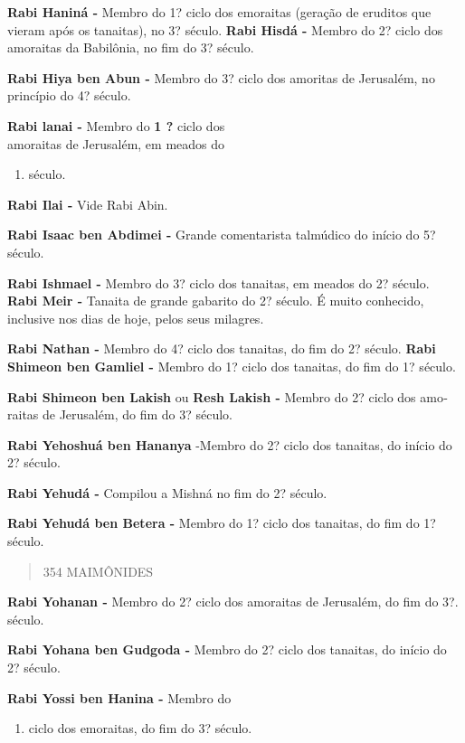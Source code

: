 \textbf{Rabi Haniná -} Membro do 1? ciclo dos emoraitas (geração de
eruditos que vieram após os tanaitas), no 3? século. \textbf{Rabi Hisdá
-} Membro do 2? ciclo dos amoraitas da Babilônia, no fim do 3? século.

\textbf{Rabi Hiya ben Abun -} Membro do 3? ciclo dos amoritas de
Jerusalém, no princípio do 4? século.

\textbf{Rabi lanai -} Membro do \textbf{1 ?} ciclo dos\\
amoraitas de Jerusalém, em meados do

\begin{enumerate}
\def\labelenumi{\arabic{enumi}.}
\setcounter{enumi}{2}
\item
  século.
\end{enumerate}

\textbf{Rabi Ilai -} Vide Rabi Abin.

\textbf{Rabi Isaac ben Abdimei -} Grande co­mentarista talmúdico do
início do 5? século.

\textbf{Rabi Ishmael -} Membro do 3? ciclo dos tanaitas, em meados do 2?
século. \textbf{Rabi Meir -} Tanaita de grande gabari­to do 2? século. É
muito conhecido, inclusive nos dias de hoje, pelos seus milagres.

\textbf{Rabi Nathan -} Membro do 4? ciclo dos tanaitas, do fim do 2?
século. \textbf{Rabi Shimeon ben Gamliel -} Mem­bro do 1? ciclo dos
tanaitas, do fim do 1? século.

\textbf{Rabi Shimeon ben Lakish} ou \textbf{Resh Lakish -} Membro do 2?
ciclo dos amo­raitas de Jerusalém, do fim do 3? sé­culo.

\textbf{Rabi Yehoshuá ben Hananya} -Membro do 2? ciclo dos tanaitas, do
início do 2? século.

\textbf{Rabi Yehudá -} Compilou a Mishná no fim do 2? século.

\textbf{Rabi Yehudá ben Betera -} Membro do 1? ciclo dos tanaitas, do
fim do 1? século.

\begin{quote}
354 MAIMÔNIDES
\end{quote}

\textbf{Rabi Yohanan -} Membro do 2? ciclo dos amoraitas de Jerusalém,
do fim do 3?. século.

\textbf{Rabi Yohana ben Gudgoda -} Mem­bro do 2? ciclo dos tanaitas, do
início do 2? século.

\textbf{Rabi Yossi ben Hanina -} Membro do

\begin{enumerate}
\def\labelenumi{\arabic{enumi}.}
\setcounter{enumi}{1}
\item
  ciclo dos emoraitas, do fim do 3? século.
\end{enumerate}

